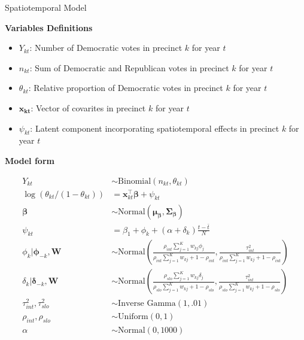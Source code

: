 \documentclass[final]{beamer}
\newlength{\colwidmiddle}
\begin{document}
\begin{frame}[t]
\begin{columns}[t]
\begin{column}{\colwidmiddle}
\begin{alertblock}{Spatiotemporal Model}
\vspace{.2in}
   
\textbf{Variables Definitions}
\begin{itemize}
  \item $Y_{kt}$: Number of Democratic votes in precinct $k$ for year
  $t$
  \item $n_{kt}$: Sum of Democratic and Republican votes in precinct
    $k$ for year $t$
  \item $\theta_{kt}$: Relative proportion of Democratic votes in
    precinct $k$ for year $t$
  \item $\mathbf{x_{kt}}$: Vector of covarites in precinct $k$ for
    year $t$
  \item $\psi_{kt}$: Latent component incorporating spatiotemporal
    effects in precinct $k$ for year $t$
\end{itemize}

  \vspace{.5in}

   
\textbf{Model form}

\begin{align*}
  Y_{kt} &\sim \text{Binomial}( n_{kt}, \theta_{kt} ) \\
    \log \left( \theta_{kt}/(1 - \theta_{kt}) \right) &= \mathbf{x}_{kt}^\top\mathbf{\beta} + \psi_{kt} \\
  \mathbf{\beta} &\sim \text{Normal}(\mathbf{\mu}_{\mathbf{\beta}},
                   \mathbf{\Sigma}_{\mathbf{\beta}})\\
  \psi_{kt} &= \beta_1 + \phi_k + (\alpha +
              \delta_k)\frac{t-\bar{t}}{N} \\
  \phi_k | \pmb{\phi}_{-k}, \mathbf{W} &\sim \text{Normal}\left(
          \frac{\rho_{int} \sum_{j=1}^K  w_{kj}
                                        \phi_j}{\rho_{int}\sum_{j=1}^K
                                        w_{kj} + 1 - \rho_{int}},
          \frac{\tau^2_{int}}{\rho_{int}\sum_{j=1}^K
                                        w_{kj} + 1 -
                                        \rho_{int}}\right)\\
  \delta_k | \pmb{\delta}_{-k}, \mathbf{W} &\sim \text{Normal}\left(
          \frac{\rho_{slo} \sum_{j=1}^K  w_{kj}
                                        \delta_j}{\rho_{slo}\sum_{j=1}^K
                                        w_{kj} + 1 - \rho_{slo}},
          \frac{\tau^2_{int}}{\rho_{slo}\sum_{j=1}^K
                                        w_{kj} + 1 -
                                                \rho_{slo}}\right)\\
  \tau_{int}^2, \tau_{slo}^2 &\sim \text{Inverse Gamma}(1,.01)\\
  \rho_{int}, \rho_{slo} &\sim \text{Uniform}(0,1)\\
  \alpha &\sim \text{Normal}(0, 1000)\\
\end{align*}


\end{alertblock}
\end{column}
\end{columns}
\end{frame}
\end{document}

